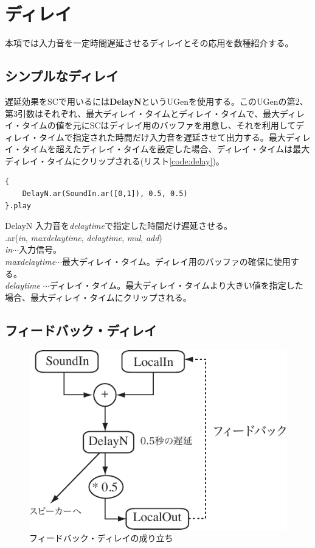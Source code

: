 \documentclass{jsarticle}
\begin{document}
\section{ディレイ}
本項では入力音を一定時間遅延させるディレイとその応用を数種紹介する。

\subsection{シンプルなディレイ}

遅延効果をSCで用いるには{\bf DelayN}というUGenを使用する。このUGenの第2、第3引数はそれぞれ、最大ディレイ・タイムとディレイ・タイムで、最大ディレイ・タイムの値を元にSCはディレイ用のバッファを用意し、それを利用してディレイ・タイムで指定された時間だけ入力音を遅延させて出力する。最大ディレイ・タイムを超えたディレイ・タイムを設定した場合、ディレイ・タイムは最大ディレイ・タイムにクリップされる(リスト\ref{code:delay})。
\begin{lstlisting}[caption=ディレイ, label=code:delay]
{
	DelayN.ar(SoundIn.ar([0,1]), 0.5, 0.5)
}.play
\end{lstlisting}

\begin{itembox}[l]{DelayN}
	{\footnotesize 
	入力音を{\it delaytime}で指定した時間だけ遅延させる。\\
	.ar({\it in}, {\it maxdelaytime}, {\it delaytime}, {\it mul}, {\it add})\\
	{\it in}$\cdots$入力信号。\\
	{\it maxdelaytime}$\cdots$最大ディレイ・タイム。ディレイ用のバッファの確保に使用する。\\
	{\it delaytime} $\cdots$ディレイ・タイム。最大ディレイ・タイムより大きい値を指定した場合、最大ディレイ・タイムにクリップされる。
	}
\end{itembox}

\subsection{フィードバック・ディレイ}
\begin{figure}[htbp]
	\begin{center}
		\includegraphics[scale=0.7]{feedback.pdf}
	\end{center}
	\caption{フィードバック・ディレイの成り立ち}
	\label{fig:feedback}
\end{figure}
\end{document}
